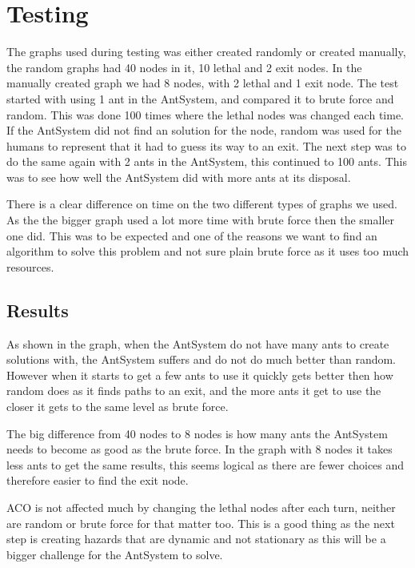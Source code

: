 \chapter{Testing}
\label{ch:testing}

The graphs used during testing was either created randomly or created manually, the random graphs had 40 nodes in it, 10 lethal and 2 exit nodes. In the manually created graph we had 8 nodes, with 2 lethal and 1 exit node. The test started with using 1 ant in the AntSystem, and compared it to brute force and random. This was done 100 times where the lethal nodes was changed each time. If the AntSystem did not find an solution for the node, random was used for the humans to represent that it had to guess its way to an exit. The next step was to do the same again with 2 ants in the AntSystem, this continued to 100 ants. This was to see how well the AntSystem did with more ants at its disposal.

There is a clear difference on time on the two different types of graphs we used. As the the bigger graph used a lot more time with brute force then the smaller one did. This was to be expected and one of the reasons we want to find an algorithm to solve this problem and not sure plain brute force as it uses too much resources.

\section{Results}
As shown in the graph, when the AntSystem do not have many ants to create solutions with, the AntSystem suffers and do not do much better than random. However when it starts to get a few ants to use it quickly gets better then how random does as it finds paths to an exit, and the more ants it get to use the closer it gets to the same level as brute force.

The big difference from 40 nodes to 8 nodes is how many ants the AntSystem needs to become as good as the brute force. In the graph with 8 nodes it takes less ants to get the same results, this seems logical as there are fewer choices and therefore easier to find the exit node.

ACO is not affected much by changing the lethal nodes after each turn, neither are random or brute force for that matter too. This is a good thing as the next step is creating hazards that are dynamic and not stationary as this will be a bigger challenge for the AntSystem to solve. 

